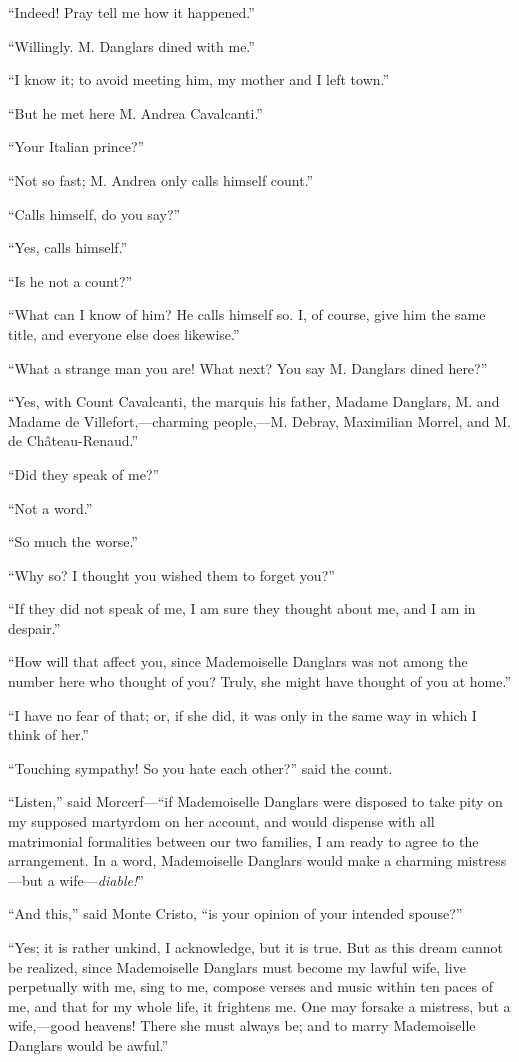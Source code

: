 “Indeed! Pray tell me how it happened.”

“Willingly. M. Danglars dined with me.”

“I know it; to avoid meeting him, my mother and I left town.”

“But he met here M. Andrea Cavalcanti.”

“Your Italian prince?”

“Not so fast; M. Andrea only calls himself count.”

“Calls himself, do you say?”

“Yes, calls himself.”

“Is he not a count?”

“What can I know of him? He calls himself so. I, of course, give him
the same title, and everyone else does likewise.”

“What a strange man you are! What next? You say M. Danglars dined
here?”

“Yes, with Count Cavalcanti, the marquis his father, Madame Danglars,
M. and Madame de Villefort,—charming people,—M. Debray, Maximilian
Morrel, and M. de Château-Renaud.”

“Did they speak of me?”

“Not a word.”

“So much the worse.”

“Why so? I thought you wished them to forget you?”

“If they did not speak of me, I am sure they thought about me, and I am
in despair.”

“How will that affect you, since Mademoiselle Danglars was not among
the number here who thought of you? Truly, she might have thought of
you at home.”

“I have no fear of that; or, if she did, it was only in the same way in
which I think of her.”

“Touching sympathy! So you hate each other?” said the count.

“Listen,” said Morcerf—“if Mademoiselle Danglars were disposed to take
pity on my supposed martyrdom on her account, and would dispense with
all matrimonial formalities between our two families, I am ready to
agree to the arrangement. In a word, Mademoiselle Danglars would make a
charming mistress—but a wife—\textit{diable!}”

“And this,” said Monte Cristo, “is your opinion of your intended
spouse?”

“Yes; it is rather unkind, I acknowledge, but it is true. But as this
dream cannot be realized, since Mademoiselle Danglars must become my
lawful wife, live perpetually with me, sing to me, compose verses and
music within ten paces of me, and that for my whole life, it frightens
me. One may forsake a mistress, but a wife,—good heavens! There she
must always be; and to marry Mademoiselle Danglars would be awful.”

